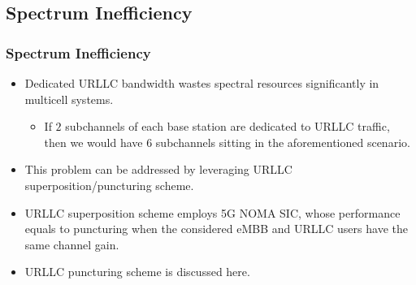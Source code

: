 \subsection{Spectrum Inefficiency}
\begin{frame}
  \frametitle{Spectrum Inefficiency}
  \begin{itemize}
    \item Dedicated URLLC bandwidth wastes spectral resources significantly in multicell systems.
      \begin{itemize}
        \item If $2$ subchannels of each base station are dedicated to URLLC traffic, then we would have $6$ subchannels sitting  in the aforementioned scenario.
      \end{itemize}
  \end{itemize}
\end{frame}

\begin{frame}
  \begin{itemize}
    \item This problem can be addressed by leveraging URLLC superposition/puncturing scheme. %
    \item URLLC superposition scheme employs 5G NOMA SIC, whose performance equals to puncturing when the considered eMBB and URLLC users have the same channel gain. %
    \item URLLC puncturing scheme is discussed here.
  \end{itemize}
\end{frame}
